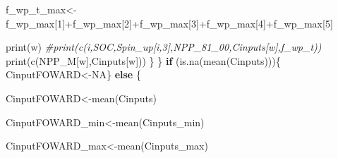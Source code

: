 \documentclass[
  10pt,
  b5paper,
]{book}
\newenvironment{Shaded}{\begin{snugshade}}{\end{snugshade}}
\newcommand{\CommentTok}[1]{\textcolor[rgb]{0.56,0.35,0.01}{\textit{#1}}}
\newcommand{\ConstantTok}[1]{\textcolor[rgb]{0.00,0.00,0.00}{#1}}
\newcommand{\ControlFlowTok}[1]{\textcolor[rgb]{0.13,0.29,0.53}{\textbf{#1}}}
\newcommand{\DecValTok}[1]{\textcolor[rgb]{0.00,0.00,0.81}{#1}}
\newcommand{\FunctionTok}[1]{\textcolor[rgb]{0.00,0.00,0.00}{#1}}
\newcommand{\NormalTok}[1]{#1}
\newcommand{\OtherTok}[1]{\textcolor[rgb]{0.56,0.35,0.01}{#1}}
\newcommand{\SpecialCharTok}[1]{\textcolor[rgb]{0.00,0.00,0.00}{#1}}
\begin{document}
\begin{Shaded}
\begin{Highlighting}[]
\NormalTok{f\_wp\_t\_max}\OtherTok{\textless{}{-}}\NormalTok{f\_wp\_max[}\DecValTok{1}\NormalTok{]}\SpecialCharTok{+}\NormalTok{f\_wp\_max[}\DecValTok{2}\NormalTok{]}\SpecialCharTok{+}\NormalTok{f\_wp\_max[}\DecValTok{3}\NormalTok{]}\SpecialCharTok{+}\NormalTok{f\_wp\_max[}\DecValTok{4}\NormalTok{]}\SpecialCharTok{+}\NormalTok{f\_wp\_max[}\DecValTok{5}\NormalTok{]}

\FunctionTok{print}\NormalTok{(w)}
\CommentTok{\#print(c(i,SOC,Spin\_up[i,3],NPP\_81\_00,Cinputs[w],f\_wp\_t))}
\FunctionTok{print}\NormalTok{(}\FunctionTok{c}\NormalTok{(NPP\_M[w],Cinputs[w]))}
\NormalTok{\}}
\NormalTok{\}}
\ControlFlowTok{if}\NormalTok{ (}\FunctionTok{is.na}\NormalTok{(}\FunctionTok{mean}\NormalTok{(Cinputs)))\{ CinputFOWARD}\OtherTok{\textless{}{-}}\ConstantTok{NA}\NormalTok{\} }\ControlFlowTok{else}\NormalTok{ \{ }

\NormalTok{CinputFOWARD}\OtherTok{\textless{}{-}}\FunctionTok{mean}\NormalTok{(Cinputs)}

\NormalTok{CinputFOWARD\_min}\OtherTok{\textless{}{-}}\FunctionTok{mean}\NormalTok{(Cinputs\_min)}

\NormalTok{CinputFOWARD\_max}\OtherTok{\textless{}{-}}\FunctionTok{mean}\NormalTok{(Cinputs\_max)}


\end{Highlighting}
\end{Shaded}
\end{document}
